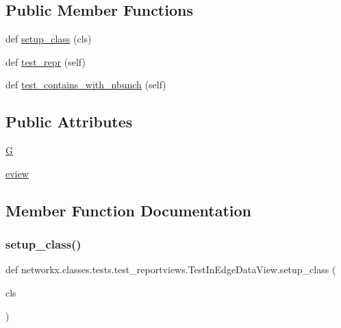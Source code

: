 \subsection*{Public Member Functions}
\begin{DoxyCompactItemize}
\item 
def \hyperlink{classnetworkx_1_1classes_1_1tests_1_1test__reportviews_1_1TestInEdgeDataView_ab51ae718aec209d11d0a443c8a213fbc}{setup\+\_\+class} (cls)
\item 
def \hyperlink{classnetworkx_1_1classes_1_1tests_1_1test__reportviews_1_1TestInEdgeDataView_a13f9ac5c133a50e77eb514189ba95c98}{test\+\_\+repr} (self)
\item 
def \hyperlink{classnetworkx_1_1classes_1_1tests_1_1test__reportviews_1_1TestInEdgeDataView_aa6fa3c5f4b563f784ab65e6b60bd7c07}{test\+\_\+contains\+\_\+with\+\_\+nbunch} (self)
\end{DoxyCompactItemize}
\subsection*{Public Attributes}
\begin{DoxyCompactItemize}
\item 
\hyperlink{classnetworkx_1_1classes_1_1tests_1_1test__reportviews_1_1TestInEdgeDataView_ad8417a9ef244b6b9a910b5a8257bb98c}{G}
\item 
\hyperlink{classnetworkx_1_1classes_1_1tests_1_1test__reportviews_1_1TestInEdgeDataView_a78248cf5c7fc9c5b4e41ea669dacce2b}{eview}
\end{DoxyCompactItemize}


\subsection{Member Function Documentation}
\mbox{\label{classnetworkx_1_1classes_1_1tests_1_1test__reportviews_1_1TestInEdgeDataView_ab51ae718aec209d11d0a443c8a213fbc}} 
\subsubsection{\texorpdfstring{setup\+\_\+class()}{setup\_class()}}
{\footnotesize\ttfamily def networkx.\+classes.\+tests.\+test\+\_\+reportviews.\+Test\+In\+Edge\+Data\+View.\+setup\+\_\+class (\begin{DoxyParamCaption}\item[{}]{cls }\end{DoxyParamCaption})}

